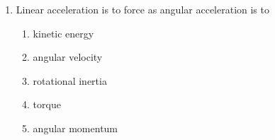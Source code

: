 \documentclass{../../../oss-apphys}
\begin{document}
\genheader


\genmultidirections

\gengravity

\raggedcolumns
\begin{multicols}{2}
  \begin{enumerate}[leftmargin=18pt]

  \item Linear acceleration is to force as angular acceleration is to
    \begin{enumerate}[noitemsep,topsep=0pt,leftmargin=18pt,label=(\Alph*)]
    \item kinetic energy
    \item angular velocity
    \item rotational inertia
    \item torque
    \item angular momentum
    \end{enumerate}


\end{enumerate}
\end{multicols}
\end{document}
